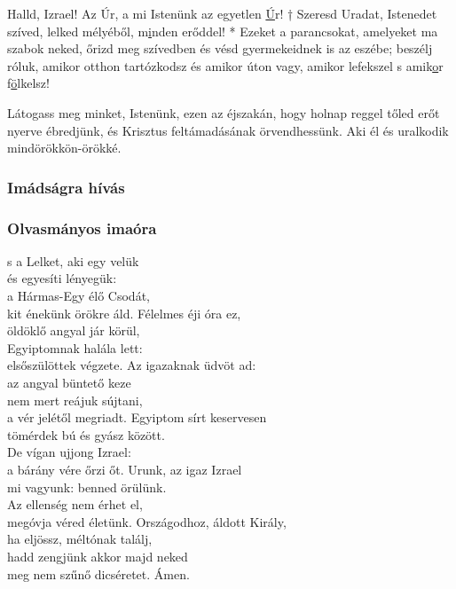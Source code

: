 \documentclass[twoside]{article}
\begin{document}
Halld, Izrael! Az Úr, a mi Istenünk az egyetlen \underline{Ú}r! † Szeresd Uradat, Istenedet szíved, lelked mélyéből, m\underline{i}nden erőddel! * Ezeket a parancsokat, amelyeket ma szabok neked, őrizd meg szívedben és vésd gyermekeidnek is az eszébe; beszélj róluk, amikor otthon tartózkodsz és amikor úton vagy, amikor lefekszel s amik\underline{o}r f\underline{ö}lkelsz!

Látogass meg minket, Istenünk, ezen az éjszakán, hogy holnap reggel tőled erőt nyerve ébredjünk, és
Krisztus feltámadásának örvendhessünk. Aki él és uralkodik mindörökkön-örökké.

\subsubsection*{Imádságra hívás}

\label{D/Inv}



\subsubsection*{Olvasmányos imaóra}



\begin{hymnstanzas}
    s a Lelket, aki egy velük\\
    és egyesíti lényegük:\\
    a Hármas-Egy élő Csodát,\\
    kit énekünk örökre áld.
\stanzabreak
    Félelmes éji óra ez,\\
    öldöklő angyal jár körül,\\
    Egyiptomnak halála lett:\\
    elsőszülöttek végzete.
\stanzabreak
    Az igazaknak üdvöt ad:\\
    az angyal büntető keze\\
    nem mert reájuk sújtani,\\
    a vér jelétől megriadt.
\stanzabreak
    Egyiptom sírt keservesen\\
    tömérdek bú és gyász között.\\
    De vígan ujjong Izrael:\\
    a bárány vére őrzi őt.
\stanzabreak
    Urunk, az igaz Izrael\\
    mi vagyunk: benned örülünk.\\
    Az ellenség nem érhet el,\\
    megóvja véred életünk.
\stanzabreak
    Országodhoz, áldott Király,\\
    ha eljössz, méltónak találj,\\
    hadd zengjünk akkor majd neked\\
    meg nem szűnő dicséretet. Ámen.
\end{hymnstanzas}
\end{document}
